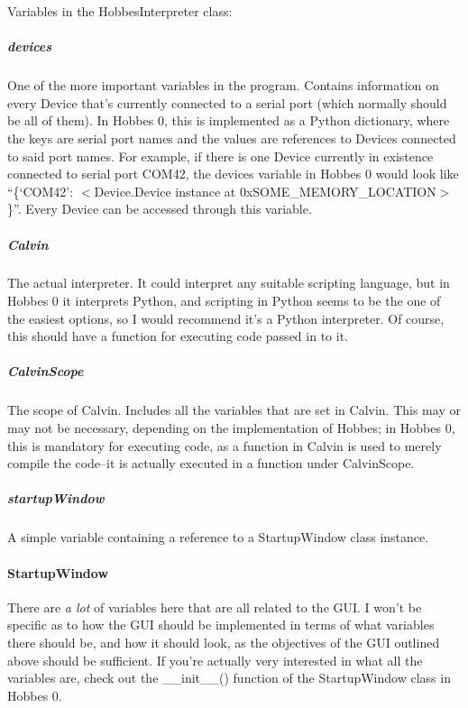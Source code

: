 \documentclass[12pt,letterpaper]{article}
\begin{document}
Variables in the HobbesInterpreter class:

\setcounter{subparagraph}{-1}



%
%
\subparagraph{devices}
\label{4.1.2.2.0}

One of the more important variables in the program. Contains information on every Device that's currently connected to a serial port (which normally should be all of them). In Hobbes 0, this is implemented as a Python dictionary, where the keys are serial port names and the values are references to Devices connected to said port names. For example, if there is one Device currently in existence connected to serial port COM42, the devices variable in Hobbes 0 would look like ``\{`COM42': $<$Device.Device instance at 0xSOME\_MEMORY\_LOCATION$>$\}''. Every Device can be accessed through this variable.



%
%
\subparagraph{Calvin}
\label{4.1.2.2.1}

The actual interpreter. It could interpret any suitable scripting language, but in Hobbes 0 it interprets Python, and scripting in Python seems to be the one of the easiest options, so I would recommend it's a Python interpreter. Of course, this should have a function for executing code passed in to it.



%
%
\subparagraph{CalvinScope}
\label{4.1.2.2.2}

The scope of Calvin. Includes all the variables that are set in Calvin. This may or may not be necessary, depending on the implementation of Hobbes; in Hobbes 0, this is mandatory for executing code, as a function in Calvin is used to merely compile the code--it is actually executed in a function under CalvinScope.



%
%
\subparagraph{startupWindow}
\label{4.1.2.2.3}

A simple variable containing a reference to a StartupWindow class instance.



%
%
\paragraph{StartupWindow}
\label{4.1.2.3}

There are \emph{a lot} of variables here that are all related to the GUI. I won't be specific as to how the GUI should be implemented in terms of what variables there should be, and how it should look, as the objectives of the GUI outlined above should be sufficient. If you're actually very interested in what all the variables are, check out the \_\_init\_\_() function of the StartupWindow class in Hobbes 0.
\end{document}
